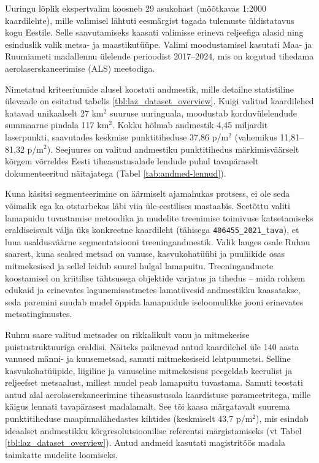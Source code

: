 Uuringu lõplik ekspertvalim koosneb 29 asukohast (mõõtkavas 1:2000 kaardilehte), mille valimisel lähtuti eesmärgist tagada tulemuste üldistatavus kogu Eestile. Selle saavutamiseks kaasati valimisse erineva reljeefiga alasid ning esinduslik valik metsa- ja maastikutüüpe. Valimi moodustamisel kasutati Maa- ja Ruumiameti madallennu ülelende perioodist 2017–2024, mis on kogutud tihedama aerolaserskaneerimise (ALS) meetodiga.

Nimetatud kriteeriumide alusel koostati andmestik, mille detailne statistiline ülevaade on esitatud tabelis \ref{tbl:laz_dataset_overview}. Kuigi valitud kaardilehed katavad unikaalselt 27 km$^2$ suuruse uuringuala, moodustab korduvülelendude summaarne pindala 117 km$^2$. Kokku hõlmab andmestik 4,45 miljardit laserpunkti, saavutades keskmise punktitiheduse 37,86 p/m$^2$ (vahemikus 11,81--81,32 p/m$^2$). Seejuures on valitud andmestiku punktitihedus märkimisväärselt kõrgem võrreldes Eesti tiheasustusalade lendude puhul tavapäraselt dokumenteeritud näitajatega (Tabel \ref{tab:andmed-lennud}).


Kuna käsitsi segmenteerimine on äärmiselt ajamahukas protsess, ei ole seda võimalik ega ka otstarbekas läbi viia üle-eestilises mastaabis. Seetõttu valiti lamapuidu tuvastamise metoodika ja mudelite treenimise toimivuse katsetamiseks eraldiseisvalt välja üks konkreetne kaardileht (tähisega \texttt{406455\_2021\_tava}), et luua usaldusväärne segmentatsiooni treeningandmestik. Valik langes osale Ruhnu saarest, kuna sealsed metsad on vanuse, kasvukohatüübi ja puuliikide osas mitmekesised ja sellel leidub suurel hulgal lamapuitu. Treeningandmete koostamisel on kriitilise tähtsusega objektide varjatus ja tihedus -- mida rohkem edukaid ja erinevates lagunemisastmetes lamatüvesid andmestikku kaasatakse, seda paremini suudab mudel õppida lamapuidule iseloomulikke jooni erinevates metsatingimustes.

Ruhnu saare valitud metsades on rikkalikult vanu ja mitmekesise puistustruktuuriga eraldisi. Näiteks paiknevad antud kaardilehel üle 140 aasta vanused männi- ja kuusemetsad, samuti mitmekesiseid lehtpuumetsi. Selline kasvukohatüüpide, liigiline ja vanuseline mitmekesisus peegeldab keerulist ja reljeefset metsaalust, millest mudel peab lamapuitu tuvastama. Samuti teostati antud alal aerolaserskaneerimine tiheasustusala kaardistuse parameetritega, mille käigus lennati tavapärasest madalamalt. See tõi kaasa märgatavalt suurema punktitiheduse maapinnalähedastes kihtides (keskmiselt 43,7 p/m$^2$), mis esindab ideaalset andmestikku kõrgresolutsioonilise referentsi märgistamiseks (vt Tabel \ref{tbl:laz_dataset_overview}). Antud andmeid kasutati magistritöös madala taimkatte mudelite loomiseks.



